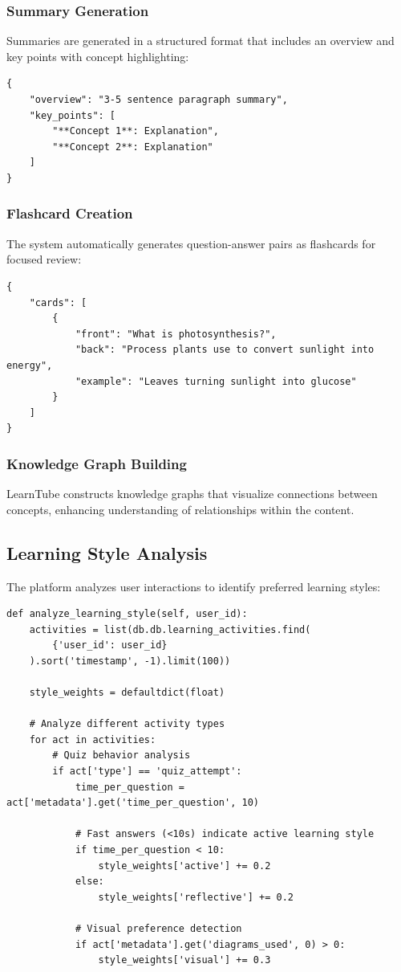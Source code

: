\documentclass[conference]{IEEEtran}
\begin{document}
\subsubsection{Summary Generation}
Summaries are generated in a structured format that includes an overview and key points with concept highlighting:

\begin{verbatim}
{
    "overview": "3-5 sentence paragraph summary",
    "key_points": [
        "**Concept 1**: Explanation",
        "**Concept 2**: Explanation"
    ]
}
\end{verbatim}

\subsubsection{Flashcard Creation}
The system automatically generates question-answer pairs as flashcards for focused review:

\begin{verbatim}
{
    "cards": [
        {
            "front": "What is photosynthesis?",
            "back": "Process plants use to convert sunlight into energy",
            "example": "Leaves turning sunlight into glucose"
        }
    ]
}
\end{verbatim}

\subsubsection{Knowledge Graph Building}
LearnTube constructs knowledge graphs that visualize connections between concepts, enhancing understanding of relationships within the content.

\subsection{Learning Style Analysis}
The platform analyzes user interactions to identify preferred learning styles:

\begin{verbatim}
def analyze_learning_style(self, user_id):
    activities = list(db.db.learning_activities.find(
        {'user_id': user_id}
    ).sort('timestamp', -1).limit(100))

    style_weights = defaultdict(float)
    
    # Analyze different activity types
    for act in activities:
        # Quiz behavior analysis
        if act['type'] == 'quiz_attempt':
            time_per_question = act['metadata'].get('time_per_question', 10)
            
            # Fast answers (<10s) indicate active learning style
            if time_per_question < 10:
                style_weights['active'] += 0.2
            else:
                style_weights['reflective'] += 0.2
                
            # Visual preference detection
            if act['metadata'].get('diagrams_used', 0) > 0:
                style_weights['visual'] += 0.3
\end{verbatim}
\end{document}
